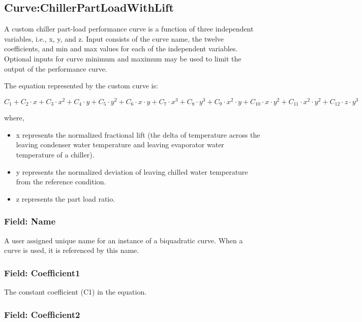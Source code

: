 \subsection{Curve:ChillerPartLoadWithLift}\label{curvechillerpartloadwithlift}

A custom chiller part-load performance curve is a function of three independent variables, i.e., x, y, and z. Input consists of the curve name, the twelve coefficients, and min and max values for each of the independent variables. Optional inputs for curve minimum and maximum may be used to limit the output of the performance curve.

The equation represented by the custom curve is:

\begin{equation}
C_1 + C_2 \cdot x + C_3 \cdot x^2 + C_4 \cdot y + C_5 \cdot y^2 + C_6 \cdot x \cdot y + C_7 \cdot x^3 + C_8 \cdot y^3 + C_9 \cdot x^2 \cdot y + C_{10} \cdot x \cdot y^2 + C_{11} \cdot x^2 \cdot y^2 + C_{12} \cdot z \cdot y^3
\end{equation}

where,

\begin{itemize}
\tightlist
\item
  x represents the normalized fractional lift (the delta of temperature across the leaving condenser water temperature and leaving evaporator water temperature of a chiller).
\item
  y represents the normalized deviation of leaving chilled water temperature from the reference condition.
\item
  z represents the part load ratio.
\end{itemize}

\subsubsection{Field: Name}\label{field-name-9-011}

A user assigned unique name for an instance of a biquadratic curve. When a curve is used, it is referenced by this name.

\subsubsection{Field: Coefficient1}\label{field-coefficient1}

The constant coefficient (C1) in the equation.

\subsubsection{Field: Coefficient2}\label{field-coefficient2}

